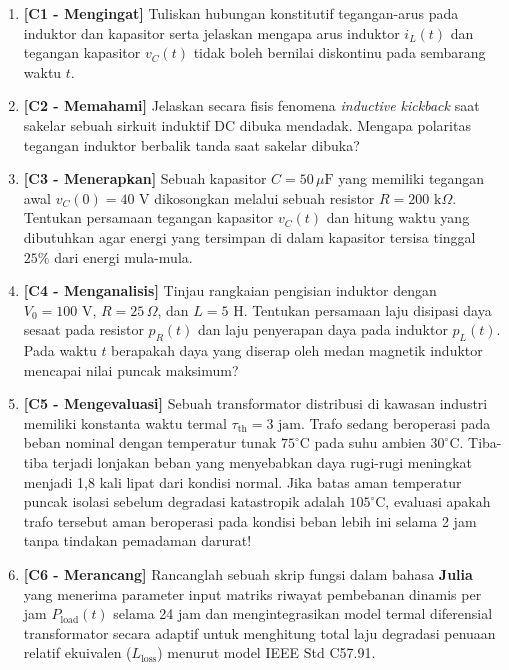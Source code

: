 \documentclass[11pt,a4paper]{article}
\theoremstyle{definition}
\begin{document}
\begin{enumerate}[leftmargin=*]
    \item \textbf{[C1 - Mengingat]} Tuliskan hubungan konstitutif tegangan-arus pada induktor dan kapasitor serta jelaskan mengapa arus induktor $i_L(t)$ dan tegangan kapasitor $v_C(t)$ tidak boleh bernilai diskontinu pada sembarang waktu $t$.
    
    \item \textbf{[C2 - Memahami]} Jelaskan secara fisis fenomena \textit{inductive kickback} saat sakelar sebuah sirkuit induktif DC dibuka mendadak. Mengapa polaritas tegangan induktor berbalik tanda saat sakelar dibuka?
    
    \item \textbf{[C3 - Menerapkan]} Sebuah kapasitor $C = 50\,\mu\text{F}$ yang memiliki tegangan awal $v_C(0) = 40\text{ V}$ dikosongkan melalui sebuah resistor $R = 200\text{ k}\Omega$. Tentukan persamaan tegangan kapasitor $v_C(t)$ dan hitung waktu yang dibutuhkan agar energi yang tersimpan di dalam kapasitor tersisa tinggal $25\%$ dari energi mula-mula.
    
    \item \textbf{[C4 - Menganalisis]} Tinjau rangkaian pengisian induktor dengan $V_0 = 100\text{ V}$, $R = 25\,\Omega$, dan $L = 5\text{ H}$. Tentukan persamaan laju disipasi daya sesaat pada resistor $p_R(t)$ dan laju penyerapan daya pada induktor $p_L(t)$. Pada waktu $t$ berapakah daya yang diserap oleh medan magnetik induktor mencapai nilai puncak maksimum?
    
    \item \textbf{[C5 - Mengevaluasi]} Sebuah transformator distribusi di kawasan industri memiliki konstanta waktu termal $\tau_{\text{th}} = 3\text{ jam}$. Trafo sedang beroperasi pada beban nominal dengan temperatur tunak $75^\circ\text{C}$ pada suhu ambien $30^\circ\text{C}$. Tiba-tiba terjadi lonjakan beban yang menyebabkan daya rugi-rugi meningkat menjadi 1,8 kali lipat dari kondisi normal. Jika batas aman temperatur puncak isolasi sebelum degradasi katastropik adalah $105^\circ\text{C}$, evaluasi apakah trafo tersebut aman beroperasi pada kondisi beban lebih ini selama 2 jam tanpa tindakan pemadaman darurat!
    
    \item \textbf{[C6 - Merancang]} Rancanglah sebuah skrip fungsi dalam bahasa \textbf{Julia} yang menerima parameter input matriks riwayat pembebanan dinamis per jam $P_{\text{load}}(t)$ selama 24 jam dan mengintegrasikan model termal diferensial transformator secara adaptif untuk menghitung total laju degradasi penuaan relatif ekuivalen ($L_{\text{loss}}$) menurut model IEEE Std C57.91.
\end{enumerate}
\end{document}
